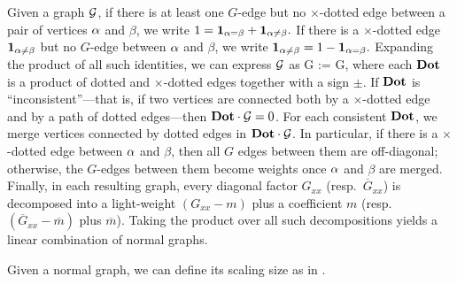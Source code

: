\begin{definition} \label{dot-def}
Given a graph $\cal G$, if there is at least one $G$-edge but no $\times$-dotted edge between a pair of vertices $\al$ and $\beta$, we write
 $1=\mathbf 1_{\al=\beta} + \mathbf 1_{\al \ne \beta} .$
If there is a $\times$-dotted edge $\mathbf{1}_{\al \ne \beta}$ but no $G$-edge between $\al$ and $\beta$, we write 
 $\mathbf 1_{\al\ne \beta} =1 - \mathbf 1_{\al = \beta}.$
Expanding the product of all such identities, we can express $\cal G$ as
 \be\label{odot}\cal G := \sum {\Dot} \cdot \cal G,\ee
 where each ${\Dot}$ is a product of dotted and $\times$-dotted edges together with a sign $\pm$. If $\Dot$ is ``inconsistent''---that is, if two vertices are connected both by a $\times$-dotted edge and by a path of dotted edges---then $\Dot \cdot \cal G = 0$.  
 For each consistent ${\Dot}$, we merge vertices connected by dotted edges in ${\Dot} \cdot \cal G$. In particular, if there is a $\times$-dotted edge between $\al$ and $\beta$, then all $G$ edges between them are off-diagonal; otherwise, the $G$-edges between them become weights once $\al$ and $\beta$ are merged. Finally, in each resulting graph, every diagonal factor $G_{xx}$ (resp.~$\overline{G}_{xx}$) is decomposed into a light-weight $(G_{xx}-m)$ plus a coefficient $m$ (resp.~$(\overline{G}_{xx}-\overline m)$ plus $\overline m$). Taking the product over all such decompositions yields a linear combination of normal graphs.
 
  \end{definition}

Given a normal graph, we can define its scaling size as in . 



